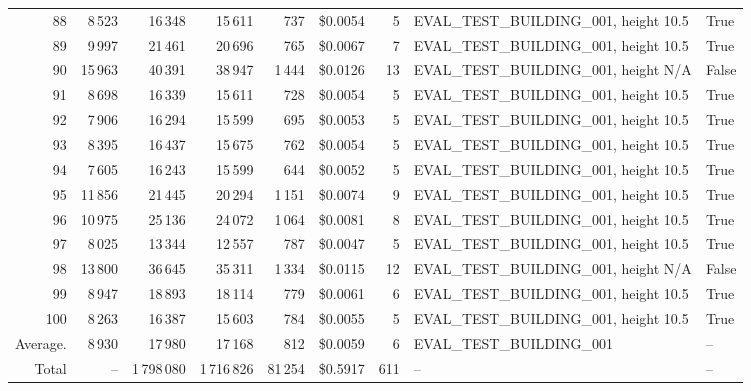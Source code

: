 \documentclass[a4paper,11pt]{article}
\begin{document}
\begin{table}[ht]
\begin{tabular}{r r r r r r r p{3cm} l}
88 & 8\,523 & 16\,348 & 15\,611 & 737 & \$0.0054 & 5 & EVAL\_TEST\_BUILDING\_001, height 10.5 & True \\
89 & 9\,997 & 21\,461 & 20\,696 & 765 & \$0.0067 & 7 & EVAL\_TEST\_BUILDING\_001, height 10.5 & True \\
90 & 15\,963 & 40\,391 & 38\,947 & 1\,444 & \$0.0126 & 13 & EVAL\_TEST\_BUILDING\_001, height N/A & False \\
91 & 8\,698 & 16\,339 & 15\,611 & 728 & \$0.0054 & 5 & EVAL\_TEST\_BUILDING\_001, height 10.5 & True \\
92 & 7\,906 & 16\,294 & 15\,599 & 695 & \$0.0053 & 5 & EVAL\_TEST\_BUILDING\_001, height 10.5 & True \\
93 & 8\,395 & 16\,437 & 15\,675 & 762 & \$0.0054 & 5 & EVAL\_TEST\_BUILDING\_001, height 10.5 & True \\
94 & 7\,605 & 16\,243 & 15\,599 & 644 & \$0.0052 & 5 & EVAL\_TEST\_BUILDING\_001, height 10.5 & True \\
95 & 11\,856 & 21\,445 & 20\,294 & 1\,151 & \$0.0074 & 9 & EVAL\_TEST\_BUILDING\_001, height 10.5 & True \\
96 & 10\,975 & 25\,136 & 24\,072 & 1\,064 & \$0.0081 & 8 & EVAL\_TEST\_BUILDING\_001, height 10.5 & True \\
97 & 8\,025 & 13\,344 & 12\,557 & 787 & \$0.0047 & 5 & EVAL\_TEST\_BUILDING\_001, height 10.5 & True \\
98 & 13\,800 & 36\,645 & 35\,311 & 1\,334 & \$0.0115 & 12 & EVAL\_TEST\_BUILDING\_001, height N/A & False \\
99 & 8\,947 & 18\,893 & 18\,114 & 779 & \$0.0061 & 6 & EVAL\_TEST\_BUILDING\_001, height 10.5 & True \\
100 & 8\,263 & 16\,387 & 15\,603 & 784 & \$0.0055 & 5 & EVAL\_TEST\_BUILDING\_001, height 10.5 & True \\
\hline
Average. & 8\,930 & 17\,980 & 17\,168 & 812 & \$0.0059 & 6 & EVAL\_TEST\_BUILDING\_001 & -- \\
Total & -- & 1\,798\,080 & 1\,716\,826 & 81\,254 & \$0.5917 & 611 & -- & -- \\
\hline
\end{tabular}
\end{table}

\clearpage
\end{document}
